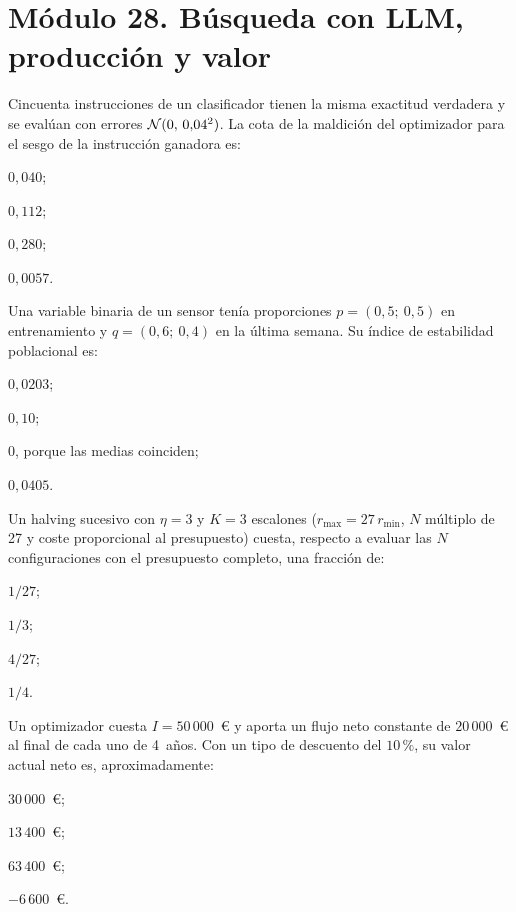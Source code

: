 \section*{Módulo 28. Búsqueda con LLM, producción y valor}

\begin{cuestiones}[resume]
\item {} Cincuenta instrucciones de un clasificador tienen la misma exactitud verdadera y se evalúan con errores $\mathcal{N}(0,\,0{,}04^{2})$. La cota de la maldición del optimizador para el sesgo de la instrucción ganadora es:
\begin{opciones}
  \item $0{,}040$;
  \item $0{,}112$;
  \item $0{,}280$;
  \item $0{,}0057$.
\end{opciones}

\item {} Una variable binaria de un sensor tenía proporciones $p=(0{,}5;\ 0{,}5)$ en entrenamiento y $q=(0{,}6;\ 0{,}4)$ en la última semana. Su índice de estabilidad poblacional es:
\begin{opciones}
  \item $0{,}0203$;
  \item $0{,}10$;
  \item $0$, porque las medias coinciden;
  \item $0{,}0405$.
\end{opciones}

\item {} Un halving sucesivo con $\eta=3$ y $K=3$ escalones ($r_{\max}=27\,r_{\min}$, $N$ múltiplo de 27 y coste proporcional al presupuesto) cuesta, respecto a evaluar las $N$ configuraciones con el presupuesto completo, una fracción de:
\begin{opciones}
  \item $1/27$;
  \item $1/3$;
  \item $4/27$;
  \item $1/4$.
\end{opciones}

\item {} Un optimizador cuesta $I=50\,000$~€ y aporta un flujo neto constante de $20\,000$~€ al final de cada uno de 4~años. Con un tipo de descuento del $10\,\%$, su valor actual neto es, aproximadamente:
\begin{opciones}
  \item $30\,000$~€;
  \item $13\,400$~€;
  \item $63\,400$~€;
  \item $-6\,600$~€.
\end{opciones}
\end{cuestiones}
